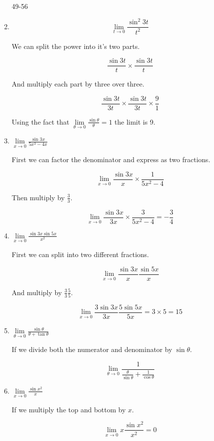 \documentclass{article}
\begin{document}
\begin{enumerate}
		\item[49-56]

		\item $$\lim \limits _{t \to 0} \frac{\sin^2 3t}{t^2}$$

			We can split the power into it's two parts.

			$$\frac{\sin 3t}{t} \times \frac{\sin 3t}{t}$$

			And multiply each part by three over three.

			$$\frac{\sin3t}{3t} \times \frac{\sin 3t}{3t} \times \frac{9}{1}$$

			Using the fact that $\lim \limits _{\theta \to 0} \frac{\sin \theta}{\theta}  = 1$ the limit
			is 9.

		\item $\lim \limits _{x \to 0} \frac{\sin 3x}{5x^3 - 4x}$

			First we can factor the denominator and express as two fractions.

			$$\lim \limits _{x \to 0} \frac{\sin 3x}{x} \times \frac{1}{5x^2 - 4}$$

			Then multiply by $\frac{3}{3}$.

			$$\lim \limits _{x \to 0} \frac{\sin 3x}{3x} \times \frac{3}{5x^2 - 4} = -\frac{3}{4}$$

		\item $\lim \limits _{x \to 0} \frac{\sin 3x \sin 5x}{x^2}$

			First we can split into two different fractions.

			$$\lim \limits _{x \to 0} \frac{\sin3x}{x} \frac{\sin5x}{x}$$

			And multiply by $\frac{3}{3} \frac{5}{5}$.

			$$\lim \limits _{x \to 0} \frac{3\sin 3x}{3x} \frac{5 \sin 5x}{5x} = 3 \times 5 = 15$$

		\item $\lim \limits _{\theta \to 0} \frac{\sin \theta}{\theta + \tan \theta}$

			If we divide both the numerator and denominator by $\sin \theta$.

			$$\lim \limits _{\theta \to 0} \frac{1}{\frac{\theta}{\sin \theta} + \frac{1}{\cos \theta}}$$

		\item $\lim \limits _{x \to 0} \frac{\sin{x^2}}{x}$

			If we multiply the top and bottom by $x$.

			$$\lim \limits _{x \to 0} x \frac{\sin{x^2}}{x^2} = 0$$


\end{enumerate}
\end{document}

